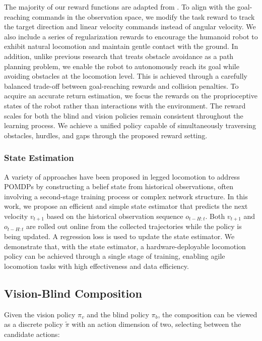 The majority of our reward functions are adapted from \cite{long2024learning, cheng2024extreme}. To align with the goal-reaching commands in the observation space, we modify the task reward to track the target direction and linear velocity commands instead of angular velocity. We also include a series of regularization rewards to encourage the humanoid robot to exhibit natural locomotion and maintain gentle contact with the ground. In addition, unlike previous research that treats obstacle avoidance as a path planning problem, we enable the robot to autonomously reach its goal while avoiding obstacles at the locomotion level. This is achieved through a carefully balanced trade-off between goal-reaching rewards and collision penalties. To acquire an accurate return estimation, we focus the rewards on the proprioceptive states of the robot rather than interactions with the environment. The reward scales for both the blind and vision policies remain consistent throughout the learning process. We achieve a unified policy capable of simultaneously traversing obstacles, hurdles, and gaps through the proposed reward setting.

\subsubsection{State Estimation}
A variety of approaches have been proposed in legged locomotion to address POMDPs by constructing a belief state from historical observations, often involving a second-stage training process or complex network structure. In this work, we propose an efficient and simple state estimator that predicts the next velocity $v_{t+1}$ based on the historical observation sequence $o_{t-H:t}$. Both $v_{t+1}$ and $o_{t-H:t}$ are rolled out online from the collected trajectories while the policy is being updated. A regression loss is used to update the state estimator. We demonstrate that, with the state estimator, a hardware-deployable locomotion policy can be achieved through a single stage of training, enabling agile locomotion tasks with high effectiveness and data efficiency.

\subsection{Vision-Blind Composition}
\label{subsec:vb-com}
Given the vision policy $\pi_v$ and the blind policy $\pi_b$, the composition can be viewed as a discrete policy $\tilde{\pi}$ with an action dimension of two, selecting between the candidate actions:

